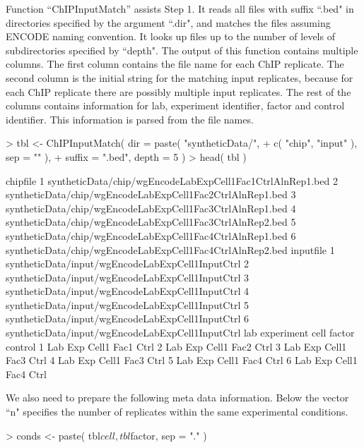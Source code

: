 \documentclass[a4paper,10pt]{article}
\begin{document}
Function ``ChIPInputMatch'' assists Step 1. It reads all files with suffix ``.bed" in directories specified by the argument ``.dir", and matches the files assuming ENCODE naming convention. It looks up files up to the number of levels of subdirectories specified by ``depth". The output of this function contains multiple columns. The first column contains the file name for each ChIP replicate. The second column is the initial string for the matching input replicates, because for each ChIP replicate there are possibly multiple input replicates. The rest of the columns contains information for lab, experiment identifier, factor and control identifier. This information is parsed from the file names.

\begin{Schunk}
\begin{Sinput}
> tbl <- ChIPInputMatch( dir = paste( "syntheticData/", 
+                          c( "chip", "input" ), sep = "" ), 
+                       suffix = ".bed", depth = 5 )
> head( tbl )
\end{Sinput}
\begin{Soutput}
                                                   chipfile
1 syntheticData/chip/wgEncodeLabExpCell1Fac1CtrlAlnRep1.bed
2 syntheticData/chip/wgEncodeLabExpCell1Fac2CtrlAlnRep1.bed
3 syntheticData/chip/wgEncodeLabExpCell1Fac3CtrlAlnRep1.bed
4 syntheticData/chip/wgEncodeLabExpCell1Fac3CtrlAlnRep2.bed
5 syntheticData/chip/wgEncodeLabExpCell1Fac4CtrlAlnRep1.bed
6 syntheticData/chip/wgEncodeLabExpCell1Fac4CtrlAlnRep2.bed
                                         inputfile
1 syntheticData/input/wgEncodeLabExpCell1InputCtrl
2 syntheticData/input/wgEncodeLabExpCell1InputCtrl
3 syntheticData/input/wgEncodeLabExpCell1InputCtrl
4 syntheticData/input/wgEncodeLabExpCell1InputCtrl
5 syntheticData/input/wgEncodeLabExpCell1InputCtrl
6 syntheticData/input/wgEncodeLabExpCell1InputCtrl
  lab experiment  cell factor control
1 Lab        Exp Cell1   Fac1    Ctrl
2 Lab        Exp Cell1   Fac2    Ctrl
3 Lab        Exp Cell1   Fac3    Ctrl
4 Lab        Exp Cell1   Fac3    Ctrl
5 Lab        Exp Cell1   Fac4    Ctrl
6 Lab        Exp Cell1   Fac4    Ctrl
\end{Soutput}
\end{Schunk}

We also need to prepare the following meta data information. Below the vector ``n" specifies the number of replicates within the same experimental conditions.

\begin{Schunk}
\begin{Sinput}
> conds <- paste( tbl$cell, tbl$factor, sep = "." )
\end{Sinput}
\end{Schunk}
\end{document}
